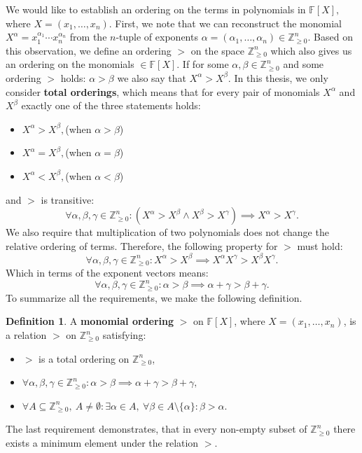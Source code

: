 \documentclass[thesis=M,english]{FITthesis}[2012/10/20]
\theoremstyle{remark}
\theoremstyle{definition}
\newtheorem{DF}{Definition}[section]
\begin{document}
\noindent We would like to establish an ordering on the terms in polynomials in $\mathbb{F}[X],$ where $X = (x_1, \ldots, x_n)$. First, we note that we can reconstruct the monomial $X^{\alpha} = x_1^{\alpha_1}\cdots x_n^{\alpha_n}$ from the $n$-tuple of exponents $\alpha = (\alpha_1,\ldots, \alpha_n) \in \mathbb{Z}_{\geq 0}^n.$ Based on this observation, we define an ordering $>$ on the space $\mathbb{Z}_{\geq 0}^n$ which also gives us an ordering on the monomials $\in \mathbb{F}[X].$ If for some $\alpha, \beta \in  \mathbb{Z}_{\geq 0}^n$ and some ordering $>$ holds: $\alpha > \beta$ we also say that $X^\alpha > X^\beta.$ In this thesis, we only consider \textbf{total orderings}, which means that for every pair of monomials $X^\alpha$ and $X^\beta$ exactly one of the three statements holds:
\begin{itemize}
\item $X^\alpha > X^\beta,$\hfill (when $\alpha > \beta$)
\item $X^\alpha = X^\beta,$\hfill (when $\alpha = \beta$)
\item $X^\alpha < X^\beta,$\hfill (when $\alpha < \beta$)
\end{itemize}
\noindent and $>$ is transitive:
$$
\forall \alpha, \beta, \gamma \in \mathbb{Z}_{\geq 0}^n: (X^\alpha > X^\beta \land X^\beta > X^\gamma) \implies X^\alpha > X^\gamma.
$$
\noindent We also require that multiplication of two polynomials does not change the relative ordering of terms. Therefore, the following property for $>$ must hold:
$$
\forall \alpha, \beta, \gamma \in \mathbb{Z}_{\geq 0}^n: X^\alpha > X^\beta \implies X^\alpha X^\gamma > X^\beta X^\gamma.
$$
\noindent Which in terms of the exponent vectors means: 
$$
\forall \alpha, \beta, \gamma \in \mathbb{Z}_{\geq 0}^n: \alpha > \beta \implies \alpha + \gamma > \beta + \gamma.
$$
\noindent To summarize all the requirements, we make the following definition.
\begin{DF}
A \textbf{monomial ordering} $>$ on $\mathbb{F}[X]$, where $X = (x_1, \ldots, x_n)$, is a relation $>$ on $\mathbb{Z}_{\geq 0}^n$ satisfying:
\begin{itemize}
\item $>$ is a total ordering on $\mathbb{Z}_{\geq 0}^n$,
\item $\forall \alpha, \beta, \gamma \in \mathbb{Z}_{\geq 0}^n: \alpha > \beta \implies \alpha + \gamma > \beta + \gamma,$
\item $\forall A \subseteq \mathbb{Z}_{\geq 0}^n,\ A \neq \emptyset: \exists \alpha \in A,\ \forall \beta \in A \setminus \{\alpha \}: \beta > \alpha.$ 
\end{itemize}
\noindent The last requirement demonstrates, that in every non-empty subset of $\mathbb{Z}_{\geq 0}^n$ there exists a minimum element under the relation $>$.
\end{DF}
\end{document}
